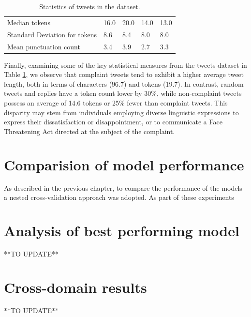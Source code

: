 \begin{table}[htbp]
\begin{tabularx}{\textwidth}{|l|X|X|X|X|}
        \rowcolor[gray]{0.9}
        Median tokens                   & 16.0                & 20.0                & 14.0                    & 13.0            \\
        Standard Deviation for tokens   & 8.6                 & 8.4                 & 8.0                     & 8.0             \\
        \hline
        \hline
        Mean punctuation count       & 3.4                 & 3.9                 & 2.7                     & 3.3             \\
        \hline
    \end{tabularx}
    \caption{Statistics of tweets in the dataset.}
    \label{tab: tweets_statistics}
\end{table}

Finally, examining some of the key statistical measures from the tweets dataset in Table \ref{tab: tweets_statistics}, we observe that complaint tweets tend to exhibit a higher average tweet length, both in terms of characters (96.7) and tokens (19.7). In contrast, random tweets and replies have a token count lower by 30\%, while non-complaint tweets possess an average of 14.6 tokens or 25\% fewer than complaint tweets. This disparity may stem from individuals employing diverse linguistic expressions to express their dissatisfaction or disappointment, or to communicate a Face Threatening Act directed at the subject of the complaint.

\section{Comparision of model performance}
As described in the previous chapter, to compare the performance of the models a nested cross-validation approach was adopted. As part of these experiments

\section{Analysis of best performing model}
**TO UPDATE**

\section{Cross-domain results}
**TO UPDATE**